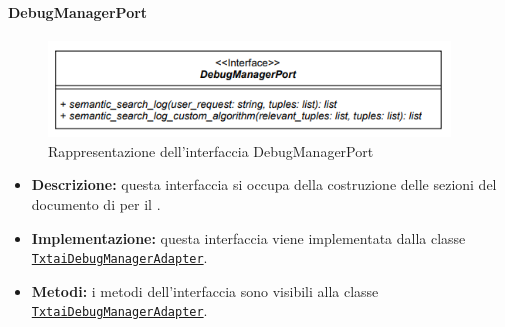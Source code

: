 
\paragraph{DebugManagerPort} \label{DebugManagerPort}
\begin{figure}[H]
    \centering
    \includegraphics[width=0.95\textwidth]{assets/Backend/debug_manager_port.png}
    \caption{Rappresentazione dell'interfaccia DebugManagerPort}
  \end{figure}
\begin{itemize}
    \item \textbf{Descrizione:} questa interfaccia si occupa della costruzione delle sezioni del documento di  per il .
    \item \textbf{Implementazione:} questa interfaccia viene implementata dalla classe \hyperref[TxtaiDebugManagerAdapter]{\texttt{TxtaiDebugManagerAdapter}}.
    \item \textbf{Metodi:} i metodi dell'interfaccia sono visibili alla classe \hyperref[TxtaiDebugManagerAdapter]{\texttt{TxtaiDebugManagerAdapter}}.
\end{itemize}  

